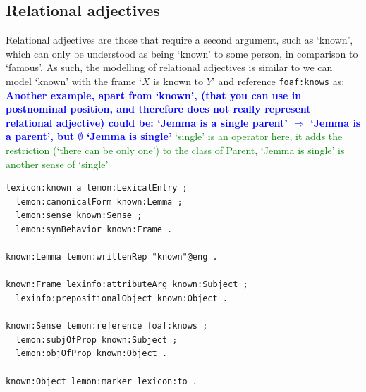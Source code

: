\documentclass[11pt]{article}
\begin{document}

\subsection{Relational adjectives}

Relational adjectives are those that require a second argument, such as `known', which
can only be understood as being `known' to some person, in comparison to `famous'.
As such, the modelling of relational adjectives is similar to we can model `known' with the frame `$X$ is known to $Y$' and
reference {\tt foaf:knows} as:
\textbf{\textcolor{blue}{Another example, apart from `known', (that you can use in postnominal position, and therefore does not really represent relational adjective) could be: `Jemma is a single parent' $\Rightarrow$ `Jemma is a parent', but $\emptyset$ `Jemma is single'}}
\textcolor{green}{`single' is an operator here, it adds the restriction (`there can be only one') to the class of Parent, `Jemma is single' is another sense of `single'}


\begin{small}\begin{verbatim}
lexicon:known a lemon:LexicalEntry ;
  lemon:canonicalForm known:Lemma ;
  lemon:sense known:Sense ;
  lemon:synBehavior known:Frame .

known:Lemma lemon:writtenRep "known"@eng .

known:Frame lexinfo:attributeArg known:Subject ;
  lexinfo:prepositionalObject known:Object .

known:Sense lemon:reference foaf:knows ;
  lemon:subjOfProp known:Subject ;
  lemon:objOfProp known:Object .
	
known:Object lemon:marker lexicon:to .
\end{verbatim}\end{small}
\end{document}
